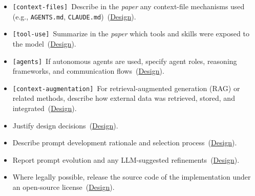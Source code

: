 \documentclass[smallextended]{svjour3}
\makeatletter
\newcommand{\must}{\textbf{must}\xspace}
\newcommand{\should}{\textbf{should}\xspace}
\newcommand{\paper}{\emph{paper}\xspace}
\newcommand{\paper}{\emph{paper}\xspace}
\newcommand{\iconM}{\usebox{\iconMbox}\xspace}
\newcommand{\iconS}{\usebox{\iconSbox}\xspace}
\newcommand{\iconM}{●\xspace}
\newcommand{\iconS}{○\xspace}
\newcommand{\condition}[1]{\texttt{\small[#1]}\,}
\newcommand{\condition}[1]{@@cond:#1@@}
\newcommand{\refdesign}{\hyperref[sec:report-system-and-prompt-design]{Design}}
\newcommand{\refdesign}{\href{/guidelines/report-system-and-prompt-design/}{Design}}
\makeatother
\begin{document}
\begin{appendices}
\begin{itemize}[label={},leftmargin=*]
    \item \iconM \condition{context-files} Describe in the \paper any context-file mechanisms used (e.g., \texttt{AGENTS.md}, \texttt{CLAUDE.md})~(\refdesign).
    \item \iconM \condition{tool-use} Summarize in the \paper which tools and skills were exposed to the model~(\refdesign).
    \item \iconM \condition{agents} If autonomous agents are used, specify agent roles, reasoning frameworks, and communication flows~(\refdesign).
    \item \iconM \condition{context-augmentation} For retrieval-augmented generation (RAG) or related methods, describe how external data was retrieved, stored, and integrated~(\refdesign).
    \item \iconS Justify design decisions~(\refdesign).
    \item \iconS Describe prompt development rationale and selection process~(\refdesign).
    \item \iconS Report prompt evolution and any LLM-suggested refinements~(\refdesign).
    \item \iconS Where legally possible, release the source code of the implementation under an open-source license~(\refdesign).

\end{itemize}
\end{appendices}
\end{document}
